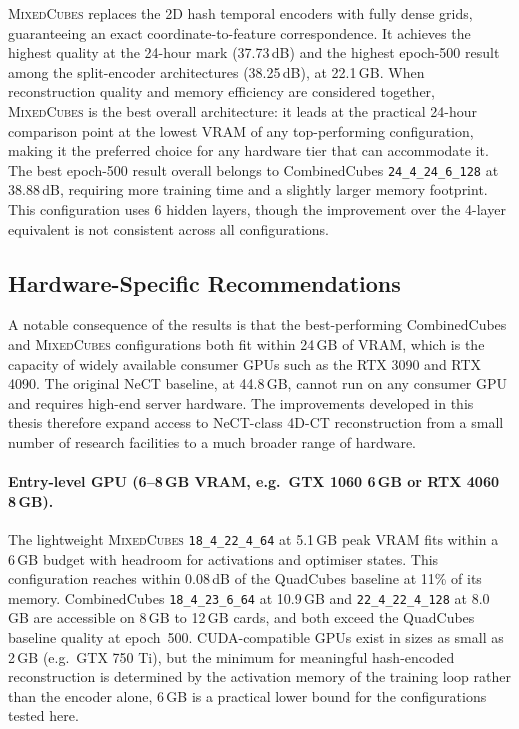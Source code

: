 \documentclass[12pt, a4paper, twoside]{report}
\newcommand{\MixedCubes}{\textsc{MixedCubes}}
\begin{document}
\MixedCubes{} replaces the 2D hash temporal encoders with fully dense grids, guaranteeing an exact coordinate-to-feature correspondence. It achieves the highest quality at the 24-hour mark (37.73\,dB) and the highest epoch-500 result among the split-encoder architectures (38.25\,dB), at 22.1\,GB. When reconstruction quality and memory efficiency are considered together, \MixedCubes{} is the best overall architecture: it leads at the practical 24-hour comparison point at the lowest VRAM of any top-performing configuration, making it the preferred choice for any hardware tier that can accommodate it. The best epoch-500 result overall belongs to CombinedCubes \texttt{24\_4\_24\_6\_128} at 38.88\,dB, requiring more training time and a slightly larger memory footprint. This configuration uses 6 hidden layers, though the improvement over the 4-layer equivalent is not consistent across all configurations.

\subsection{Hardware-Specific Recommendations}
\label{subsec:comp_disc_hardware}

A notable consequence of the results is that the best-performing CombinedCubes and \MixedCubes{} configurations both fit within 24\,GB of VRAM, which is the capacity of widely available consumer GPUs such as the RTX 3090 and RTX 4090. The original NeCT baseline, at 44.8\,GB, cannot run on any consumer GPU and requires high-end server hardware. The improvements developed in this thesis therefore expand access to NeCT-class 4D-CT reconstruction from a small number of research facilities to a much broader range of hardware.

\paragraph{Entry-level GPU (6--8\,GB VRAM, e.g.\ GTX 1060 6\,GB or RTX 4060 8\,GB).}
The lightweight \MixedCubes{} \texttt{18\_4\_22\_4\_64} at 5.1\,GB peak VRAM fits within a 6\,GB budget with headroom for activations and optimiser states. This configuration reaches within 0.08\,dB of the QuadCubes baseline at 11\% of its memory. CombinedCubes \texttt{18\_4\_23\_6\_64} at 10.9\,GB and \texttt{22\_4\_22\_4\_128} at 8.0\,GB are accessible on 8\,GB to 12\,GB cards, and both exceed the QuadCubes baseline quality at epoch~500. CUDA-compatible GPUs exist in sizes as small as 2\,GB (e.g.\ GTX 750 Ti), but the minimum for meaningful hash-encoded reconstruction is determined by the activation memory of the training loop rather than the encoder alone, 6\,GB is a practical lower bound for the configurations tested here.
\end{document}
